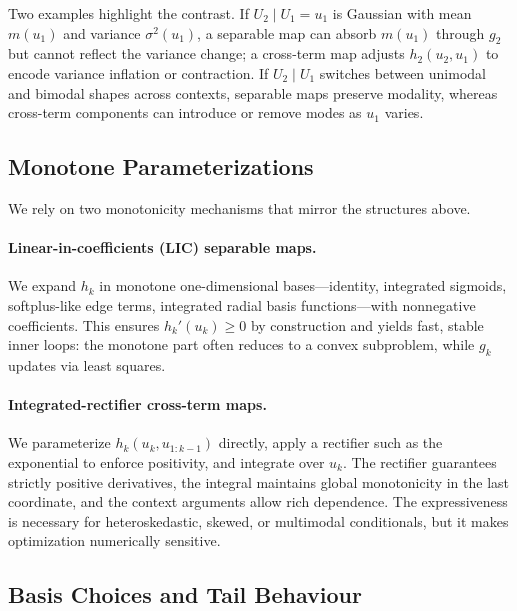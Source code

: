 \documentclass[11pt,a4paper,twoside]{book}\usepackage[]{graphicx}\usepackage[]{xcolor}
\begin{document}
Two examples highlight the contrast. If $U_2\mid U_1=u_1$ is Gaussian with mean $m(u_1)$ and variance $\sigma^2(u_1)$, a separable map can absorb $m(u_1)$ through $g_2$ but cannot reflect the variance change; a cross-term map adjusts $h_2(u_2,u_1)$ to encode variance inflation or contraction. If $U_2\mid U_1$ switches between unimodal and bimodal shapes across contexts, separable maps preserve modality, whereas cross-term components can introduce or remove modes as $u_1$ varies.

\subsection{Monotone Parameterizations}

We rely on two monotonicity mechanisms that mirror the structures above.

\paragraph{Linear-in-coefficients (LIC) separable maps.} We expand $h_k$ in monotone one-dimensional bases---identity, integrated sigmoids, softplus-like edge terms, integrated radial basis functions---with nonnegative coefficients. This ensures $h_k'(u_k) \ge 0$ by construction and yields fast, stable inner loops: the monotone part often reduces to a convex subproblem, while $g_k$ updates via least squares.

\paragraph{Integrated-rectifier cross-term maps.} We parameterize $h_k(u_k,u_{1:k-1})$ directly, apply a rectifier such as the exponential to enforce positivity, and integrate over $u_k$. The rectifier guarantees strictly positive derivatives, the integral maintains global monotonicity in the last coordinate, and the context arguments allow rich dependence. The expressiveness is necessary for heteroskedastic, skewed, or multimodal conditionals, but it makes optimization numerically sensitive.

\subsection{Basis Choices and Tail Behaviour}
\end{document}

